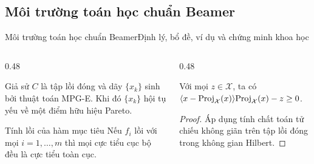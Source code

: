 \documentclass[aspectratio=43,10pt]{beamer}
\begin{document}
\subsection{Môi trường toán học chuẩn Beamer}
\begin{frame}{Môi trường toán học chuẩn Beamer}{Định lý, bổ đề, ví dụ và chứng minh khoa học}
  \begin{columns}[T]
    \begin{column}{0.48\textwidth}
      \begin{theorem}
        Giả sử $C$ là tập lồi đóng và dãy $\{x_k\}$ sinh bởi thuật toán MPG-E. Khi đó $\{x_k\}$ hội tụ yếu về một điểm hữu hiệu Pareto.
      \end{theorem}
      \vskip 2pt
      \begin{exampleblock}{Tính lồi của hàm mục tiêu}
        Nếu $f_i$ lồi với mọi $i = 1,\dots,m$ thì mọi cực tiểu cục bộ đều là cực tiểu toàn cục.
      \end{exampleblock}
    \end{column}

    \begin{column}{0.48\textwidth}
      \begin{lemma}
        Với mọi $z \in \mathcal{X}$, ta có $\langle x - \mathrm{Proj}_{\mathcal{X}}(x)\rangle{\mathrm{Proj}_{\mathcal{X}}(x) - z} \ge 0$.
      \end{lemma}
      \vskip 2pt
      \begin{proof}
        Áp dụng tính chất toán tử chiếu không giãn trên tập lồi đóng trong không gian Hilbert.
      \end{proof}
    \end{column}
  \end{columns}
\end{frame}
\end{document}
